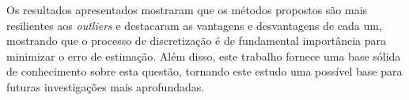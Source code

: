 Os resultados apresentados mostraram que os métodos propostos são mais resilientes aos \textit{outliers} e destacaram as vantagens e desvantagens de cada um, mostrando que o processo de discretização é de fundamental importância para minimizar o erro de estimação. Além disso, este trabalho fornece uma base sólida de conhecimento sobre esta questão, tornando este estudo uma possível base para futuras investigações mais aprofundadas.
